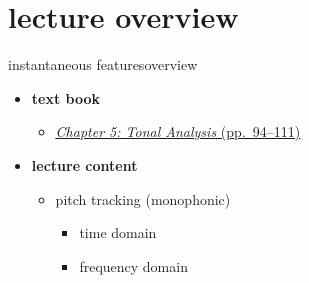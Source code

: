 

\subtitle{Part 6.2: Monophonic Fundamental Frequency Detection}


	

    \section[overview]{lecture overview}
        \begin{frame}{instantaneous features}{overview}
            \begin{itemize}
                \item   \textbf{text book}  
                    \begin{itemize}
                        \item   \href{http://ieeexplore.ieee.org/xpl/articleDetails.jsp?tp=&arnumber=6331122&}{\underline{\textit{Chapter 5: Tonal Analysis} (pp.~94--111)}}
                    \end{itemize}
                \bigskip
                \item<2->   \textbf{lecture content}
                    \begin{itemize}
                        \item<2->   pitch tracking (monophonic)
                            \begin{itemize}
                                \item   time domain
                                \item   frequency domain
                            \end{itemize}
                    \end{itemize}
            \end{itemize}
        \end{frame}


